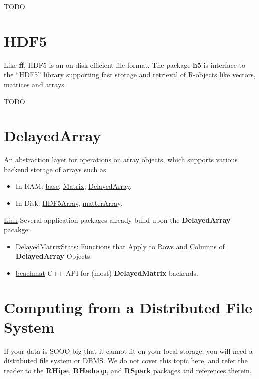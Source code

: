 \documentclass[]{book}
\providecommand{\tightlist}{%
  \setlength{\itemsep}{0pt}\setlength{\parskip}{0pt}}
\theoremstyle{definition}
\theoremstyle{definition}
\theoremstyle{definition}
\theoremstyle{remark}
\begin{document}
TODO

\section{HDF5}\label{hdf5}

Like \textbf{ff}, HDF5 is an on-disk efficient file format. The package
\textbf{h5} is interface to the ``HDF5'' library supporting fast storage
and retrieval of R-objects like vectors, matrices and arrays.

TODO

\section{DelayedArray}\label{delayedarray}

An abstraction layer for operations on array objects, which supports
various backend storage of arrays such as:

\begin{itemize}
\tightlist
\item
  In RAM: \href{}{base}, \href{}{Matrix},
  \href{https://bioconductor.org/packages/release/bioc/html/DelayedArray.html}{DelayedArray}.
\item
  In Disk:
  \href{https://bioconductor.org/packages/release/bioc/html/HDF5Array.html}{HDF5Array},
  \href{https://github.com/PeteHaitch/matterArray}{matterArray}.
\end{itemize}

\href{https://bioconductor.org/packages/release/bioc/html/DelayedArray.html}{Link}
Several application packages already build upon the
\textbf{DelayedArray} pacakge:

\begin{itemize}
\tightlist
\item
  \href{https://github.com/PeteHaitch/DelayedMatrixStats}{DelayedMatrixStats}:
  Functions that Apply to Rows and Columns of \textbf{DelayedArray}
  Objects.
\item
  \href{}{beachmat} C++ API for (most) \textbf{DelayedMatrix} backends.
\end{itemize}

\section{Computing from a Distributed File
System}\label{computing-from-a-distributed-file-system}

If your data is SOOO big that it cannot fit on your local storage, you
will need a distributed file system or DBMS. We do not cover this topic
here, and refer the reader to the \textbf{RHipe}, \textbf{RHadoop}, and
\textbf{RSpark} packages and references therein.
\end{document}
